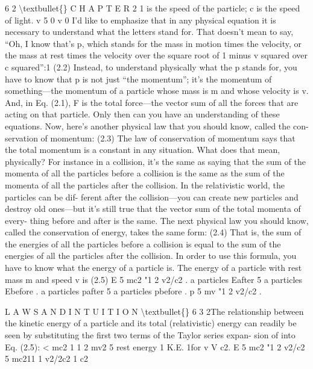 \documentclass[10pt,oneside]{article}
\begin{document}
6 2 \textbackslash{}textbullet\{\} C H A P T E R  2 1 is the speed of the particle; c is the speed of light. v 5 0 v 0 I’d like to emphasize that in any physical equation it is necessary to understand what the letters stand for. That doesn’t mean to say, “Oh, I know that’s p, which stands for the mass in motion times the velocity, or the mass at rest times the velocity over the square root of 1 minus v squared over c squared”:1 (2.2) Instead, to understand physically what the p stands for, you have to know that p is not just “the momentum”; it’s the momentum of something---the momentum of a particle whose mass is m and whose velocity is v. And, in Eq. (2.1), F is the total force---the vector sum of all the forces that are acting on that particle. Only then can you have an understanding of these equations. Now, here’s another physical law that you should know, called the con- servation of momentum: (2.3) The law of conservation of momentum says that the total momentum is a constant in any situation. What does that mean, physically? For instance in a collision, it’s the same as saying that the sum of the momenta of all the particles before a collision is the same as the sum of the momenta of all the particles after the collision. In the relativistic world, the particles can be dif- ferent after the collision---you can create new particles and destroy old ones---but it’s still true that the vector sum of the total momenta of every- thing before and after is the same. The next physical law you should know, called the conservation of energy, takes the same form: (2.4) That is, the sum of the energies of all the particles before a collision is equal to the sum of the energies of all the particles after the collision. In order to use this formula, you have to know what the energy of a particle is. The energy of a particle with rest mass m and speed v is (2.5) E 5 mc2 "1 2 v2/c2 . a particles Eafter 5 a particles Ebefore . a particles pafter 5 a particles pbefore . p 5 mv "1 2 v2/c2 .\par

L A W S  A N D  I N T U I T I O N \textbackslash{}textbullet\{\} 6 3 2The relationship between the kinetic energy of a particle and its total (relativistic) energy can readily be seen by substituting the first two terms of the Taylor series expan- sion of into Eq. (2.5): < mc2 1 1 2 mv2 5 rest energy 1 K.E. 1for v V c2. E 5 mc2 "1 2 v2/c2 5 mc211 1 v2/2c2 1 c2\par
\end{document}
